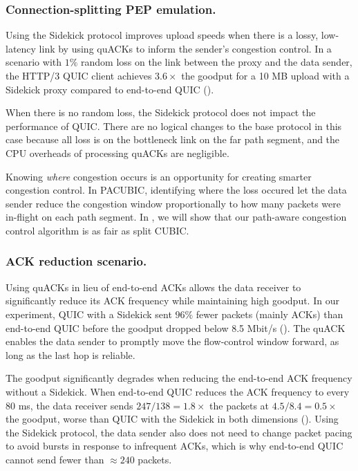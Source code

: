 \subsubsection{Connection-splitting PEP emulation.}

Using the Sidekick protocol improves upload speeds when there is a lossy, low-latency link
by using quACKs to inform the sender's congestion control.
In a scenario with $1\%$ random loss on the link between the proxy and the
data sender, the HTTP/3 QUIC client achieves $3.6\times$ the goodput for a
10 MB upload with a Sidekick proxy compared to end-to-end QUIC
().

When there is no random loss, the Sidekick protocol does not impact the performance of
QUIC. There are no logical changes to the base protocol in this case because
all loss is on the bottleneck link on the far path segment, and the CPU
overheads of processing quACKs are negligible.

Knowing \emph{where} congestion occurs is an opportunity for creating smarter
congestion control. In PACUBIC, identifying where the loss occured let the data
sender reduce the congestion window proportionally to how many packets were
in-flight on each path segment. In , we
will show that our path-aware congestion control algorithm is as fair as split CUBIC.

\subsubsection{ACK reduction scenario.}

Using quACKs in lieu of end-to-end ACKs allows the data receiver to
significantly reduce its ACK frequency while maintaining high goodput.
In our experiment, QUIC with a Sidekick sent $96\%$ fewer packets (mainly ACKs)
than end-to-end QUIC before the goodput dropped below 8.5 Mbit/s
().
The quACK enables the data sender to promptly move the flow-control window
forward, as long as the last hop is reliable.

The goodput significantly degrades when reducing the end-to-end ACK frequency
without a Sidekick. When end-to-end QUIC reduces the ACK frequency to every
80 ms, the data receiver sends $247 / 138 = 1.8\times$ the packets at
$4.5 / 8.4 = 0.5\times$ the goodput, worse than QUIC with the Sidekick
in both dimensions ().
Using the Sidekick protocol, the data sender also does not need to change packet pacing to
avoid bursts in response to infrequent ACKs, which is why end-to-end QUIC
cannot send fewer than $\approx 240$ packets.

